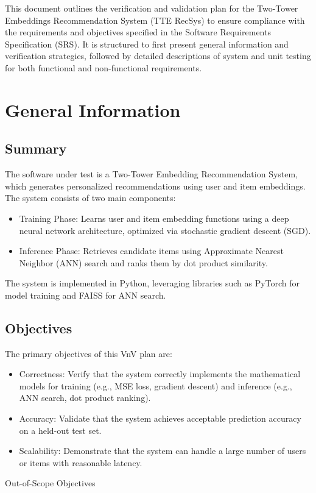 \documentclass[12pt, titlepage]{article}
\begin{document}
This document outlines the verification and validation plan for the Two-Tower Embeddings Recommendation System (TTE RecSys) to ensure compliance with the requirements and objectives specified in the Software Requirements Specification (SRS). It is structured to first present general information and verification strategies, followed by detailed descriptions of system and unit testing for both functional and non-functional requirements.

\section{General Information}

\subsection{Summary}

The software under test is a Two-Tower Embedding Recommendation System, which generates personalized recommendations using user and item embeddings. The system consists of two main components:
\begin{itemize}
  \item Training Phase: Learns user and item embedding functions using a deep neural network architecture, optimized via stochastic gradient descent (SGD).
  \item Inference Phase: Retrieves candidate items using Approximate Nearest Neighbor (ANN) search and ranks them by dot product similarity.
\end{itemize}

The system is implemented in Python, leveraging libraries such as PyTorch for model training and FAISS for ANN search.

\subsection{Objectives}
The primary objectives of this VnV plan are:
\begin{itemize}
  \item Correctness: Verify that the system correctly implements the mathematical models for training (e.g., MSE loss, gradient descent) and inference (e.g., ANN search, dot product ranking).
  \item Accuracy: Validate that the system achieves acceptable prediction accuracy on a held-out test set.
  \item Scalability: Demonstrate that the system can handle a large number of users or items with reasonable latency.
\end{itemize}
\noindent Out-of-Scope Objectives
\end{document}
